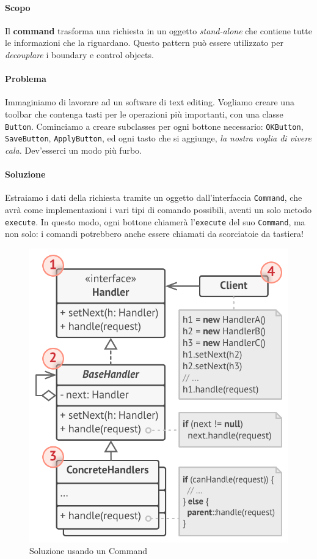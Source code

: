 \documentclass[11pt]{article}
\newcommand{\code}[1]{\texttt{#1}}
\begin{document}
\paragraph{Scopo}
Il \textbf{command} trasforma una richiesta in un oggetto \textit{stand-alone} che contiene tutte le informazioni che la riguardano. Questo pattern può essere utilizzato per \textit{decouplare} i boundary e control objects.
\paragraph{Problema}
Immaginiamo di lavorare ad un software di text editing. Vogliamo creare una toolbar che contenga tasti per le operazioni più importanti, con una classe \code{Button}. Cominciamo a creare subclasses per ogni bottone necessario: \code{OKButton}, \code{SaveButton}, \code{ApplyButton}, ed ogni tasto che si aggiunge, \textit{la nostra voglia di vivere cala.} Dev'esserci un modo più furbo.
\paragraph{Soluzione}
Estraiamo i dati della richiesta tramite un oggetto dall'interfaccia \code{Command}, che avrà come implementazioni i vari tipi di comando possibili, aventi un solo metodo \code{execute}. In questo modo, ogni bottone chiamerà l'\code{execute} del suo \code{Command}, ma non solo: i comandi potrebbero anche essere chiamati da scorciatoie da tastiera!
\begin{figure}[H]
    \includegraphics[width=\linewidth]{res/teoria/Handler.png}
    \caption{Soluzione usando un Command}
\end{figure}
\end{document}

